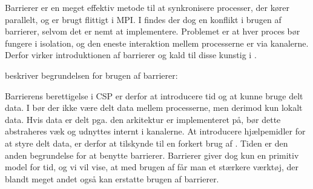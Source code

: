 Barrierer er en meget effektiv metode til at synkronisere processer, der kører 
parallelt, og er brugt flittigt i MPI. I \csp findes der dog en konflikt i brugen 
af barrierer, selvom det er nemt at implementere. Problemet er at hver proces bør fungere i isolation, og den eneste interaktion mellem processerne er via kanalerne. Derfor virker introduktionen af barrierer og kald til disse kunstig i \csp. 

\citeauthor{crew} beskriver begrundelsen for brugen af barrierer:
\begin{otherlanguage}{english}
\end{otherlanguage}
Barrierens berettigelse i CSP er derfor at  introducere tid og at kunne bruge delt data. I \csp bør der ikke være delt data mellem processerne, men derimod kun lokalt data. Hvis data er delt pga. den arkitektur \csp er implementeret på, bør dette abstraheres væk og udnyttes internt i kanalerne. At introducere hjælpemidler for at styre delt data, er derfor at tilskynde til en forkert brug af \csp. Tiden er den anden begrundelse for at benytte barrierer.
Barrierer giver dog kun en  primitiv model for tid, og vi vil vise, at med brugen af \des får man et stærkere værktøj, der blandt meget andet også kan erstatte brugen af barrierer.

